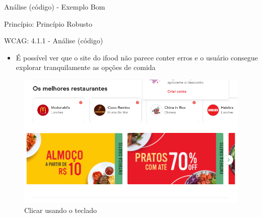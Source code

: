 \documentclass{beamer}
\begin{document}
\begin{frame}{Análise (código) - Exemplo Bom}

Princípio: Princípio Robusto

WCAG: 4.1.1 - Análise (código)

\begin{itemize}
	\item É possível ver que o site do ifood não parece conter erros e o usuário consegue explorar tranquilamente as opções de comida
\end{itemize}
\begin{figure}
    \centering
    \includegraphics[scale=0.3]{images/code.png}
    \caption{Clicar usando o teclado}
\end{figure}

\end{frame}
\end{document}
